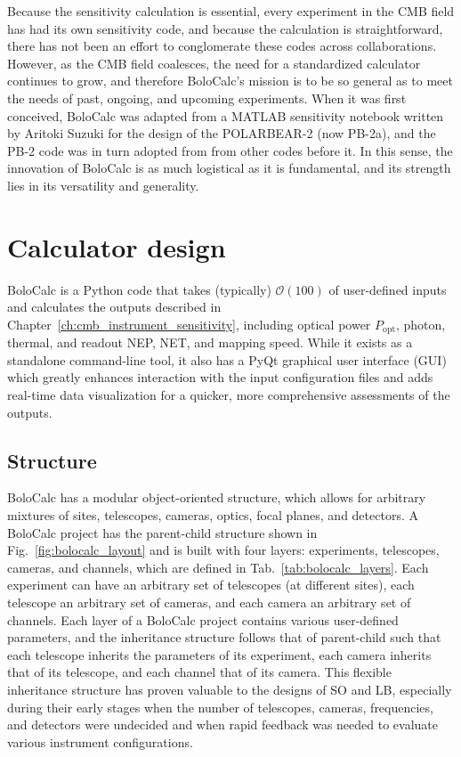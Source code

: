 Because the sensitivity calculation is essential, every experiment in the CMB field has had its own sensitivity code, and because the calculation is straightforward, there has not been an effort to conglomerate these codes across collaborations. However, as the CMB field coalesces, the need for a standardized calculator continues to grow, and therefore BoloCalc's mission is to be so general as to meet the needs of past, ongoing, and upcoming experiments. When it was first conceived, BoloCalc was adapted from a MATLAB sensitivity notebook written by Aritoki Suzuki for the design of the POLARBEAR-2 (now PB-2a), and the PB-2 code was in turn adopted from from other codes before it. In this sense, the innovation of BoloCalc is as much logistical as it is fundamental, and its strength lies in its versatility and generality.


\section{Calculator design}
\label{sec:bolocalc_design}

BoloCalc is a Python code that takes (typically) $\mathcal{O}(100)$ of user-defined inputs and calculates the outputs described in Chapter~\ref{ch:cmb_instrument_sensitivity}, including optical power $P_{\mathrm{opt}}$, photon, thermal, and readout NEP, NET, and mapping speed. While it exists as a standalone command-line tool, it also has a PyQt graphical user interface (GUI) which greatly enhances interaction with the input configuration files and adds real-time data visualization for a quicker, more comprehensive assessments of the outputs.


\subsection{Structure}
\label{sec:bolocalc_structure}

BoloCalc has a modular object-oriented structure, which allows for arbitrary mixtures of sites, telescopes, cameras, optics, focal planes, and detectors. A BoloCalc project has the parent-child structure shown in Fig.~\ref{fig:bolocalc_layout} and is built with four layers: experiments, telescopes, cameras, and channels, which are defined in Tab.~\ref{tab:bolocalc_layers}. Each experiment can have an arbitrary set of telescopes (at different sites), each telescope an arbitrary set of cameras, and each camera an arbitrary set of channels. Each layer of a BoloCalc project contains various user-defined parameters, and the inheritance structure follows that of parent-child such that each telescope inherits the parameters of its experiment, each camera inherits that of its telescope, and each channel that of its camera. This flexible inheritance structure has proven valuable to the designs of SO and LB, especially during their early stages when the number of telescopes, cameras, frequencies, and detectors were undecided and when rapid feedback was needed to evaluate various instrument configurations.


